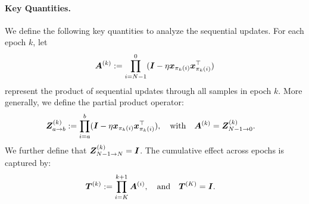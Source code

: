 \paragraph{Key Quantities.} We define the following key quantities to analyze the sequential updates. For each epoch $k$, let 
\begin{equation}
    {\bm{A}}^{(k)} := \prod_{i= N-1}^0 ({\bm{I}} - \eta {\bm{x}}_{\pi_k(i)}{\bm{x}}_{\pi_k(i)}^{\top})\label{app:A_def}
\end{equation}
represent the product of sequential updates through all samples in epoch $k$. More generally, we define the partial product operator:
\begin{align*}
    {\bm{Z}}^{(k)}_{a \to b} &:= \prod_{i=a}^b({\bm{I}} - \eta {\bm{x}}_{\pi_k(i)}{\bm{x}}_{\pi_k(i)}^{\top}), \quad \text{with} \quad {\bm{A}}^{(k)} = {\bm{Z}}^{(k)}_{N-1 \to 0}.
\end{align*}
We further define that ${\bm{Z}}^{(k)}_{N-1 \to N} = {\bm{I}}$. The cumulative effect across epochs is captured by:
\begin{align*}
    {\bm{T}}^{(k)} &:= \prod_{i=K}^{k+1}{\bm{A}}^{(i)}, \quad \text{and} \quad {\bm{T}}^{(K)} = {\bm{I}}.
\end{align*}

